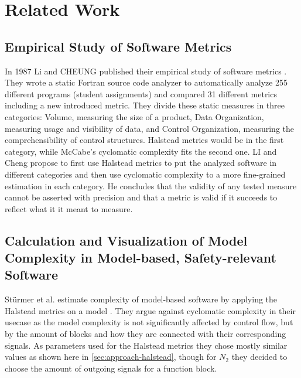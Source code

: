 \section{Related Work}


\subsection{Empirical Study of Software Metrics}

In 1987 Li and CHEUNG published their empirical study of software metrics \cite{LI:1987-Study-of-Software-Metrics}. They wrote a static Fortran source code analyzer to automatically analyze 255 different programs (student assignments) and compared 31 different metrics including a new introduced metric. They divide these static measures in three categories: Volume, measuring the size of a product, Data Organization, measuring usage and visibility of data, and Control Organization, measuring the comprehensibility of control structures. Halstead metrics would be in the first category, while McCabe's cyclomatic complexity fits the second one. LI and Cheng propose to first use Halstead metrics to put the analyzed software in different categories and then use cyclomatic complexity to a more fine-grained estimation in each category. He concludes that the validity of any tested measure cannot be asserted with precision and that a metric is valid if it succeeds to reflect what it it meant to measure.

\subsection{Calculation and Visualization of Model Complexity in Model-based, Safety-relevant Software}

Stürmer et al. estimate complexity of model-based software by applying the Halstead metrics on a model \cite{Stuermer:2010}. They argue against cyclomatic complexity in their usecase as the model complexity is not significantly affected by control flow, but by the amount of blocks and how they are connected with their corresponding signals. As parameters used for the Halstead metrics they chose mostly similar values as shown here in \autoref{sec:approach-halstead}, though for \(N_2\) they decided to choose the amount of outgoing signals for a function block.






